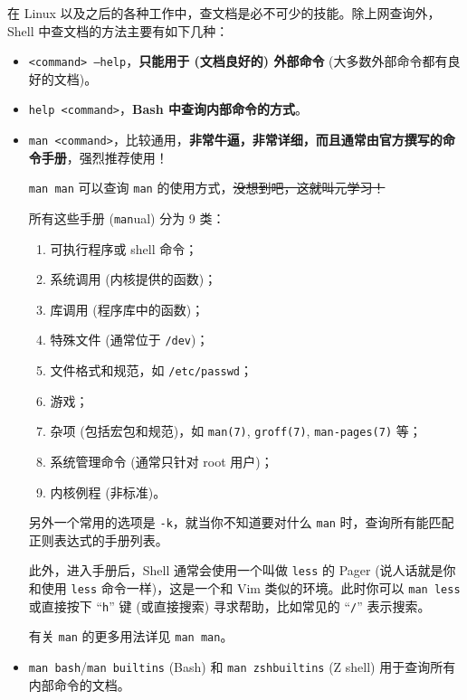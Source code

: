 \documentclass{article}
\begin{document}
	在 Linux 以及之后的各种工作中，查文档是必不可少的技能。除上网查询外，Shell 中查文档的方法主要有如下几种：
	\begin{itemize}
		\itemsep0pt
		\item \texttt{<command> --help}，\textbf{只能用于 (文档良好的) 外部命令} (大多数外部命令都有良好的文档)。
		\item \texttt{help <command>}，\textbf{Bash 中查询内部命令的方式}。
		\color{red}\item \texttt{man <command>}，比较通用，\textbf{非常牛逼，非常详细，而且通常由官方撰写的命令手册}，强烈推荐使用！

			\normalcolor\texttt{man man} 可以查询 \texttt{man} 的使用方式，\sout{没想到吧，这就叫元学习！}

			所有这些手册 (\texttt{man}ual) 分为 9 类\cite{man-man}：
			\begin{enumerate}
				\item 可执行程序或 shell 命令；
				\item 系统调用 (内核提供的函数)；
				\item 库调用 (程序库中的函数)；
				\item 特殊文件 (通常位于 \texttt{/dev})；
				\item 文件格式和规范，如 \texttt{/etc/passwd}；
				\item 游戏；
				\item 杂项 (包括宏包和规范)，如 \texttt{man(7)}, \texttt{groff(7)}, \texttt{man-pages(7)} 等；
				\item 系统管理命令 (通常只针对 root 用户)；
				\item 内核例程 (非标准)。
			\end{enumerate}


			另外一个常用的选项是 \texttt{-k}，就当你不知道要对什么 \texttt{man} 时，查询所有能匹配正则表达式的手册列表。

			此外，进入手册后，Shell 通常会使用一个叫做 \texttt{less} 的 Pager (说人话就是你和使用 \texttt{less} 命令一样)，这是一个和 Vim 类似的环境。此时你可以 \texttt{man less} 或直接按下 ``\texttt h'' 键 (或直接搜索) 寻求帮助，比如常见的 ``\texttt /'' 表示搜索。

			有关 \texttt{man} 的更多用法详见 \texttt{man man}。
		\color{fuchsia}\item{}\label{item:docbuiltin}\texttt{man bash}/\texttt{man builtins} (Bash) 和 \texttt{man zshbuiltins} (Z shell) 用于查询所有内部命令的文档。


\end{itemize}
\end{document}
